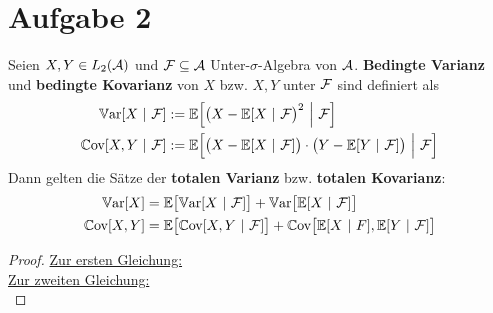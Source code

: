 \documentclass[12pt,a4paper]{article}
\begin{document}
\section*{Aufgabe 2}
Seien $X,Y\in L_2(\mathcal{A})$ und $\mathcal{F}\subseteq\mathcal{A}$ Unter-$\sigma$-Algebra von $\mathcal{A}$. \textbf{Bedingte Varianz} und \textbf{bedingte Kovarianz} von $X$ bzw. $X,Y$ unter $\mathcal{F}$ sind definiert als
\begin{align*}
\mathbb{V}\text{ar}[X~|~\mathcal{F}]&:=\mathbb{E}\Big[\big(X-\mathbb{E}[X~|~\mathcal{F}\big)^2~\Big|~\mathcal{F}\Big]\\
\mathbb{C}\text{ov}[X,Y~|~\mathcal{F}]&:=\mathbb{E}\Big[\big(X-\mathbb{E}[X~|~\mathcal{F}]\big)\cdot\big(Y-\mathbb{E}[Y~|~\mathcal{F}]\big)~\Big|~\mathcal{F}\Big]
\end{align*}
Dann gelten die Sätze der \textbf{totalen Varianz} bzw. \textbf{totalen Kovarianz}:
\begin{align*}
\mathbb{V}\text{ar}[X]&=\mathbb{E}\big[\mathbb{V}\text{ar}[X~|~\mathcal{F}]\big]+\mathbb{V}\text{ar}\big[\mathbb{E}[X~|~\mathcal{F}]\big]\\
\mathbb{C}\text{ov}[X,Y]&=\mathbb{E}\big[\mathbb{C}\text{ov}[X,Y~|~\mathcal{F}]\big]+\mathbb{C}\text{ov}\big[\mathbb{E}[X~|~F],\mathbb{E}[Y~|~\mathcal{F}]\big]
\end{align*}
\begin{proof}
\underline{Zur ersten Gleichung:}\\

\underline{Zur zweiten Gleichung:}\\
\end{proof}
\end{document}
